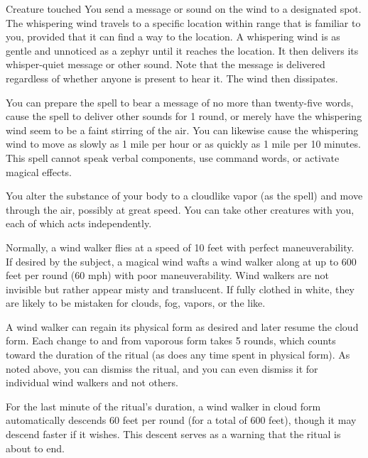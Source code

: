 \begin{spelltarget}{Creature touched}
\spelleffect You send a message or sound on the wind to a designated spot. The whispering wind travels to a specific location within range that is familiar to you, provided that it can find a way to the location. A whispering wind is as gentle and unnoticed as a zephyr until it reaches the location. It then delivers its whisper-quiet message or other sound. Note that the message is delivered regardless of whether anyone is present to hear it. The wind then dissipates.
\par You can prepare the spell to bear a message of no more than twenty-five words, cause the spell to deliver other sounds for 1 round, or merely have the whispering wind seem to be a faint stirring of the air. You can likewise cause the whispering wind to move as slowly as 1 mile per hour or as quickly as 1 mile per 10 minutes.
\spellnotes This spell cannot speak verbal components, use command words, or activate magical effects.

\spelleffect \par You alter the substance of your body to a cloudlike vapor (as the  spell) and move through the air, possibly at great speed. You can take other creatures with you, each of which acts independently.
\par Normally, a wind walker flies at a speed of 10 feet with perfect maneuverability. If desired by the subject, a magical wind wafts a wind walker along at up to 600 feet per round (60 mph) with poor maneuverability. Wind walkers are not invisible but rather appear misty and translucent. If fully clothed in white, they are likely to be mistaken for clouds, fog, vapors, or the like.
\par A wind walker can regain its physical form as desired and later resume the cloud form. Each change to and from vaporous form takes 5 rounds, which counts toward the duration of the ritual (as does any time spent in physical form). As noted above, you can dismiss the ritual, and you can even dismiss it for individual wind walkers and not others.
\par For the last minute of the ritual's duration, a wind walker in cloud form automatically descends 60 feet per round (for a total of 600 feet), though it may descend faster if it wishes. This descent serves as a warning that the ritual is about to end.


\end{spelltarget}
